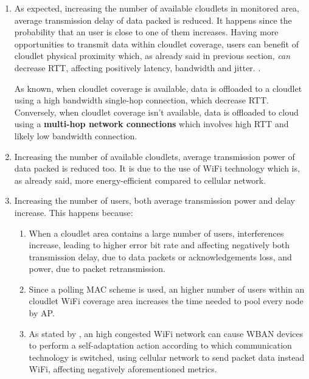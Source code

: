 \documentclass[sigchi]{acmart}
\begin{document}
\begin{enumerate}

\item As expected, increasing the number of available cloudlets in monitored area, average transmission delay of data packed is reduced. It happens since the probability  that an user is close to one of them increases. Having more opportunities to transmit data within cloudlet coverage, users can benefit of cloudlet physical proximity which, as already said in previous section, \textit{can} decrease RTT, affecting positively latency, bandwidth and jitter. \cite{TheEmergenceOfEdgeComputing}. 

As known, when cloudlet coverage is available, data is offloaded to a cloudlet using a high bandwidth single-hop connection, which decrease RTT. Conversely, when cloudlet coverage isn't available, data is offloaded to cloud using a \textbf{multi-hop network connections} which involves high RTT and likely low bandwidth connection.\cite{ArchitecturalTacticsCyberForaging}

\item Increasing the number of available cloudlets, average transmission power of data packed is reduced too. It is due to the use of WiFi technology which is, as already said, more energy-efficient compared to cellular network.

\item Increasing the number of users, both average transmission power and delay increase. This happens because:

\begin{enumerate}
\item When a cloudlet area contains a large number of users, interferences increase, leading to higher error bit rate and affecting negatively both transmission delay, due to data packets or acknowledgements loss, and power, due to packet retransmission.

\item Since a polling MAC scheme is used, an higher number of users within an cloudlet WiFi coverage area increases the time needed to pool every node by AP. 

\item As stated by \citet{MSAReport}, an high congested WiFi network can cause WBAN devices to perform a self-adaptation action according to which communication technology is switched, using cellular network to send packet data instead WiFi, affecting negatively aforementioned metrics.
\end{enumerate}

\end{enumerate}
\end{document}
